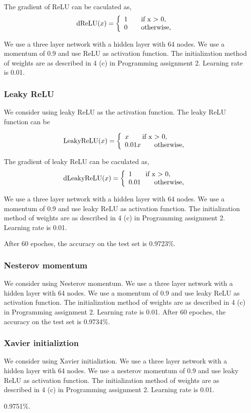 \documentclass{article} %
\begin{document}
The gradient of ReLU can be caculated as,
 \[
\textnormal{dReLU}(x) =\left\{
\begin{array}{ll}
1 \qquad \textnormal{if x $>$ 0,}\\
0 \qquad \textnormal{otherwise,}
\end{array}
\right.
\]


We use a three layer network with a hidden layer with 64 nodes. We use a momentum of 0.9 and use ReLU as activation function. The initialization method of weights are as described in 4 (c) in Programming assignment 2. Learning rate is 0.01.



\subsubsection{Leaky ReLU}

We consider using leaky ReLU as the activation function. The leaky ReLU function can be 

\[
\textnormal{LeakyReLU}(x) =\left\{
\begin{array}{ll}
x \qquad \textnormal{if x $>$ 0,}\\
0.01x \qquad \textnormal{otherwise,}
\end{array}
\right.
\]

The gradient of leaky ReLU can be caculated as,
\[
\textnormal{dLeakyReLU}(x) =\left\{
\begin{array}{ll}
1 \qquad \textnormal{if x $>$ 0,}\\
0.01 \qquad \textnormal{otherwise,}
\end{array}
\right.
\]



We use a three layer network with a hidden layer with 64 nodes. We use a momentum of 0.9 and use leaky ReLU as activation function. The initialization method of weights are as described in 4 (c) in Programming assignment 2. Learning rate is 0.01.

After 60 epoches, the accuracy on the test set is 0.9723\%.

\subsubsection{Nesterov momentum}
We consider using Nesterov momentum. We use a three layer network with a hidden layer with 64 nodes. We use a momentum of 0.9 and use leaky ReLU as activation function. The initialization method of weights are as described in 4 (c) in Programming assignment 2. Learning rate is 0.01. After 60 epoches, the accuracy on the test set is 0.9734\%.

\subsubsection{Xavier initializtion}
We consider using Xavier initializtion. We use a three layer network with a hidden layer with 64 nodes. We use a nesterov momentum of 0.9 and use leaky ReLU as activation function. The initialization method of weights are as described in 4 (c) in Programming assignment 2. Learning rate is 0.01.


0.9751\%.
\end{document}
